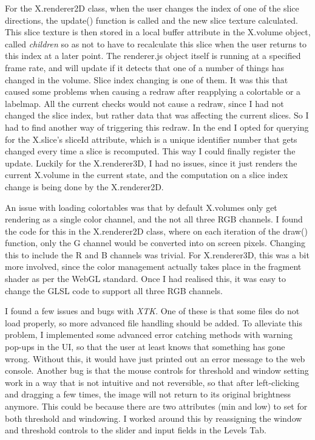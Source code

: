 \documentclass[a4paper,11pt,twoside]{article}
\begin{document}
For the X.renderer2D class, when the user changes the index of one of the slice directions, the update() function is called and the new slice texture calculated. This slice texture is then stored in a local buffer attribute in the X.volume object, called \textit{children} so as not to have to recalculate this slice when the user returns to this index at a later point. The renderer.js object itself is running at a specified frame rate, and will update if it detects that one of a number of things has changed in the volume. Slice index changing is one of them. It was this that caused some problems when causing a redraw after reapplying a colortable or a labelmap. All the current checks would not cause a redraw, since I had not changed the slice index, but rather data that was affecting the current slices. So I had to find another way of triggering this redraw. In the end I opted for querying for the X.slice's sliceId attribute, which is a unique identifier number that gets changed every time a slice is recomputed. This way I could finally register the update. Luckily for the X.renderer3D, I had no issues, since it just renders the current X.volume in the current state, and the computation on a slice index change is being done by the X.renderer2D.

An issue with loading colortables was that by default X.volumes only get rendering as a single color channel, and the not all three RGB channels. I found the code for this in the X.renderer2D class, where on each iteration of the draw() function, only the G channel would be converted into on screen pixels. Changing this to include the R and B channels was trivial. For X.renderer3D, this was a bit more involved, since the color management actually takes place in the fragment shader as per the WebGL standard. Once I had realised this, it was easy to change the GLSL code to support all three RGB channels.

I found a few issues and bugs with \textit{XTK}. One of these is that some files do not load properly, so more advanced file handling should be added. To alleviate this problem, I implemented some advanced error catching methods with warning pop-ups in the UI, so that the user at least knows that something has gone wrong. Without this, it would have just printed out an error message to the web console. Another bug is that the mouse controls for threshold and window setting work in a way that is not intuitive and not reversible, so that after left-clicking and dragging a few times, the image will not return to its original brightness anymore. This could be because there are two attributes (min and low) to set for both threshold and windowing. I worked around this by reassigning the window and threshold controls to the slider and input fields in the Levels Tab.
\end{document}
